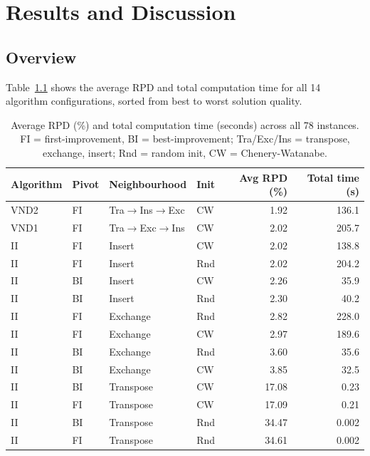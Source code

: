 \chapter{Results and Discussion}

\section{Overview}

Table~\ref{tab:summary} shows the average RPD and total computation time for
all 14 algorithm configurations, sorted from best to worst solution quality.

\begin{table}[H]
\centering
\caption{Average RPD (\%) and total computation time (seconds) across all 78
instances. FI = first-improvement, BI = best-improvement;
Tra/Exc/Ins = transpose, exchange, insert; Rnd = random init, CW =
Chenery-Watanabe.}
\label{tab:summary}
\small
\begin{tabular}{llllrr}
\toprule
Algorithm & Pivot & Neighbourhood & Init & Avg RPD (\%) & Total time (s) \\
\midrule
VND2 & FI & Tra$\to$Ins$\to$Exc & CW & 1.92 & 136.1 \\
VND1 & FI & Tra$\to$Exc$\to$Ins & CW & 2.02 & 205.7 \\
II   & FI & Insert              & CW  & 2.02 & 138.8 \\
II   & FI & Insert              & Rnd & 2.02 & 204.2 \\
II   & BI & Insert              & CW  & 2.26 & 35.9 \\
II   & BI & Insert              & Rnd & 2.30 & 40.2 \\
II   & FI & Exchange            & Rnd & 2.82 & 228.0 \\
II   & FI & Exchange            & CW  & 2.97 & 189.6 \\
II   & BI & Exchange            & Rnd & 3.60 & 35.6 \\
II   & BI & Exchange            & CW  & 3.85 & 32.5 \\
II   & BI & Transpose           & CW  & 17.08 & 0.23 \\
II   & FI & Transpose           & CW  & 17.09 & 0.21 \\
II   & BI & Transpose           & Rnd & 34.47 & 0.002 \\
II   & FI & Transpose           & Rnd & 34.61 & 0.002 \\
\bottomrule
\end{tabular}
\end{table}

